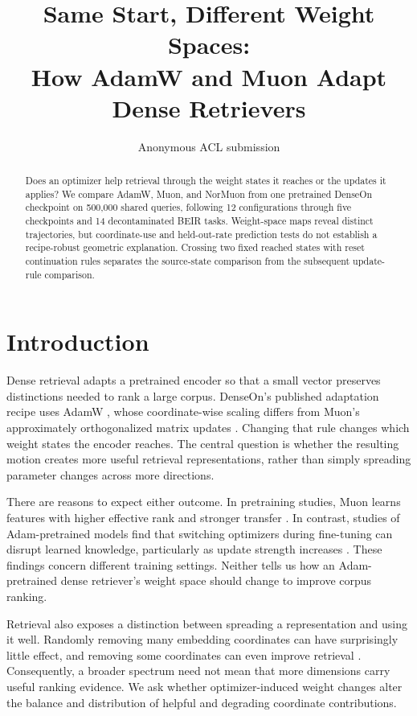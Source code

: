 \documentclass[11pt]{article}
\title{Same Start, Different Weight Spaces:\\
How AdamW and Muon Adapt Dense Retrievers}
\author{Anonymous ACL submission}
\begin{document}
\raggedbottom
\maketitle

\begin{abstract}
Does an optimizer help retrieval through the weight states it reaches or the updates it applies?
We compare AdamW, Muon, and NorMuon from one pretrained DenseOn checkpoint on 500,000 shared
queries, following 12 configurations through five checkpoints and 14 decontaminated BEIR tasks.
\CorrectedAbstractFinding{} Weight-space maps reveal distinct trajectories, but coordinate-use
and held-out-rate prediction tests do not establish a recipe-robust geometric explanation.
Crossing two fixed reached states with reset continuation rules separates the source-state
comparison from the subsequent update-rule comparison.
\StateOperatorAbstractFinding{}
\end{abstract}

\section{Introduction}

Dense retrieval adapts a pretrained encoder so that a small vector preserves distinctions needed
to rank a large corpus. DenseOn's published adaptation recipe uses AdamW
\citep{sourty2026denseon}, whose coordinate-wise scaling differs from Muon's approximately
orthogonalized matrix updates \citep{loshchilov2019decoupled,liu2025muon}. Changing that rule changes which weight states the
encoder reaches. The central question is whether the resulting motion creates more useful
retrieval representations, rather than simply spreading parameter changes across more directions.

There are reasons to expect either outcome. In pretraining studies, Muon learns features with
higher effective rank and stronger transfer \citep{ruan2026features}. In contrast, studies of
Adam-pretrained models find that switching optimizers during fine-tuning can disrupt learned
knowledge, particularly as update strength increases \citep{qu2026finetune,liu2026consistency}.
These findings concern different training settings. Neither tells us how an Adam-pretrained dense
retriever's weight space should change to improve corpus ranking.

Retrieval also exposes a distinction between spreading a representation and using it well.
Randomly removing many embedding coordinates can have surprisingly little effect, and removing
some coordinates can even improve retrieval \citep{takeshita2025dimensions}. Consequently, a
broader spectrum need not mean that more dimensions carry useful ranking evidence. We ask whether
optimizer-induced weight changes alter the balance and distribution of helpful and degrading
coordinate contributions.
\end{document}
